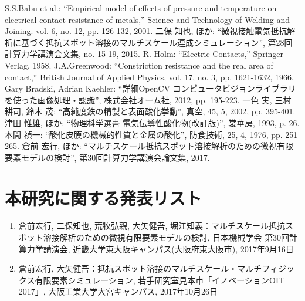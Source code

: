 

\begin{thebibliography}{99}
 S.S.Babu et al.: ``Empirical model of effects of pressure and temperature on electrical contact resistance of metals,'' Science and Technology of Welding and Joining. vol. 6, no. 12, pp. 126-132, 2001. 
 二保 知也, ほか: ``微視接触電気抵抗解析に基づく抵抗スポット溶接のマルチスケール連成シミュレーション'', 第28回計算力学講演会文集, no. 15-19, 2015. 
 R. Holm: ``Electric Contacts,'' Springer-Verlag, 1958. 
 J.A.Greenwood: ``Constriction resistance and the real area of contact,'' British Journal of Applied Physics, vol. 17, no. 3, pp. 1621-1632, 1966. 
 Gary Bradski, Adrian Kaehler: ``詳細OpenCV コンピュータビジョンライブラリを使った画像処理・認識'', 株式会社オーム社, 2012, pp. 195-223. 
 一色 実, 三村 耕司, 鈴木 茂: ``高純度鉄の精製と表面酸化挙動'', 真空, 45, 5, 2002, pp. 395-401. 
 津田 惟雄, ほか: ``物理科学選書 電気伝導性酸化物(改訂版)'', 裳華房, 1993, p. 26. 
 本間 禎一: ``酸化皮膜の機械的性質と金属の酸化'', 防食技術, 25, 4, 1976, pp. 251-265. 
 倉前 宏行, ほか: ``マルチスケール抵抗スポット溶接解析のための微視有限要素モデルの検討'', 第30回計算力学講演会論文集, 2017. 
\end{thebibliography}

\section*{本研究に関する発表リスト}
\begin{enumerate}
\renewcommand{\labelenumi}{[\arabic{enumi}]}
\item
倉前宏行, 二保知也, 荒牧弘親, 大矢健吾, 堀江知義：マルチスケール抵抗スポット溶接解析のための微視有限要素モデルの検討, 日本機械学会 第30回計算力学講演会, 近畿大学東大阪キャンパス(大阪府東大阪市), 2017年9月16日

\item
倉前宏行, 大矢健吾：抵抗スポット溶接のマルチスケール・マルチフィジックス有限要素シミュレーション, 若手研究室見本市「イノベーションOIT 2017」, 大阪工業大学大宮キャンパス, 2017年10月26日
\end{enumerate}




\endinput

